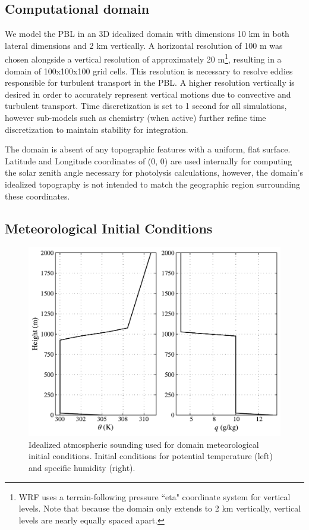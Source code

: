 \fi


\subsection{Computational domain}
We model the PBL in an 3D idealized domain with dimensions 10 km in both lateral dimensions and 2 km vertically. A horizontal resolution of 100 m was chosen alongside a vertical resolution of approximately 20 m\footnote{WRF uses a terrain-following pressure ``eta" coordinate system for vertical levels. Note that because the domain only extends to 2 km vertically, vertical levels are nearly equally spaced apart.}, resulting in a domain of 100x100x100 grid cells. This resolution is necessary to resolve eddies responsible for turbulent transport in the PBL. A higher resolution vertically is desired in order to accurately represent vertical motions due to convective and turbulent transport. Time discretization is set to 1 second for all simulations, however sub-models such as chemistry (when active) further refine time discretization to maintain stability for integration. 

The domain is absent of any topographic features with a uniform, flat surface.  Latitude and Longitude coordinates of (0, 0) are used internally for computing the solar zenith angle necessary for photolysis calculations, however, the domain's idealized topography is not intended to match the geographic region surrounding these coordinates. 

\subsection{Meteorological Initial Conditions}
 
 \begin{figure}[h]
	\centering
	\includegraphics[width=\textwidth]{figures/chapter3/WRF-LES_default_sounding.pdf}
	\caption{Idealized atmospheric sounding used for domain meteorological initial conditions. Initial conditions for potential temperature (left) and specific humidity (right).}
	\label{fig:sounding}
\end{figure}


